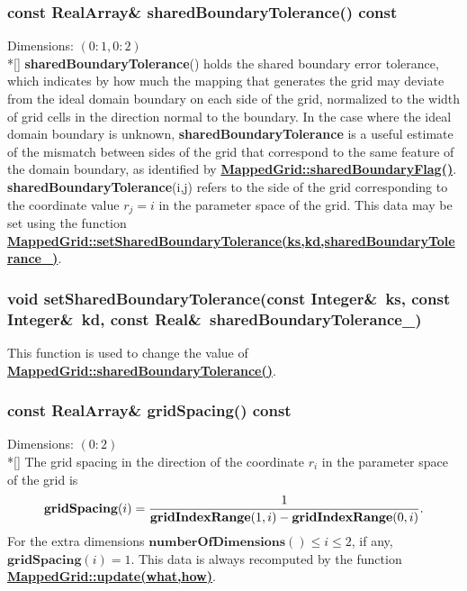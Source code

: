 \documentclass{article}
\begin{document}
  \subsubsection{const RealArray\& sharedBoundaryTolerance() const}
  \label{MappedGrid::sharedBoundaryTolerance()}
    Dimensions: $(0\colon1,0\colon2)$ \\*[\parskip]
    \textbf{sharedBoundaryTolerance}() holds the shared boundary error tolerance, which
    indicates by how much the mapping that generates the grid may deviate from the
    ideal domain boundary on each side of the grid, normalized to the width of grid
    cells in the direction normal to the boundary.  In the case where the ideal domain boundary
    is unknown, \textbf{sharedBoundaryTolerance} is a useful estimate of the mismatch
    between sides of the grid that correspond to the same feature of the domain boundary, as
    identified by
    {\bf{}\hyperref{sharedBoundaryFlag()}{sharedBoundaryFlag() \rm(\S}{)}{MappedGrid::sharedBoundaryFlag()}}.
    \textbf{sharedBoundaryTolerance}(i,j) refers to the side of the grid corresponding to
    the coordinate value $r_j = i$ in the parameter space of the grid.
    This data may be set using the function
    {\bf{}\hyperref{setSharedBoundaryTolerance(ks,kd,sharedBoundaryTolerance\_)}{setSharedBoundaryTolerance(ks,kd,sharedBoundaryTolerance\_) \rm(\S}{)}{MappedGrid::setSharedBoundaryTolerance(ks,kd,sharedBoundaryTolerance_)}}.

  \subsubsection{void setSharedBoundaryTolerance(const Integer\&~ks, const Integer\&~kd, const Real\&~sharedBoundaryTolerance\_)}
  \label{MappedGrid::setSharedBoundaryTolerance(ks,kd,sharedBoundaryTolerance_)}
    This function is used to change the value of
    {\bf{}\hyperref{sharedBoundaryTolerance()}{sharedBoundaryTolerance() \rm(\S}{)}{MappedGrid::sharedBoundaryTolerance()}}.

  \subsubsection{const RealArray\& gridSpacing() const}
  \label{MappedGrid::gridSpacing()}
    Dimensions: $(0\colon2)$ \\*[\parskip]
    The grid spacing in the direction of the coordinate $r_i$ in the parameter space of the grid is
    \[ \textbf{gridSpacing}(i) = {1 \over \textbf{gridIndexRange}(1,i) - \textbf{gridIndexRange}(0,i)}. \]
    For the extra dimensions $\textbf{numberOfDimensions}()\le i \le 2$, if any, $\textbf{gridSpacing}(i)=1$.
    This data is always recomputed by the function
    {\bf{}\hyperref{update(what,how)}{update(what,how) \rm(\S}{)}{MappedGrid::update(what,how)}}.
\end{document}

